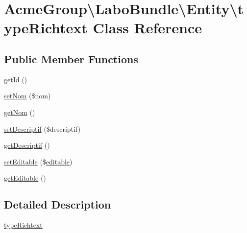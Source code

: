 \hypertarget{class_acme_group_1_1_labo_bundle_1_1_entity_1_1type_richtext}{\section{Acme\+Group\textbackslash{}Labo\+Bundle\textbackslash{}Entity\textbackslash{}type\+Richtext Class Reference}
\label{class_acme_group_1_1_labo_bundle_1_1_entity_1_1type_richtext}
}
\subsection*{Public Member Functions}
\begin{DoxyCompactItemize}
\item 
\hyperlink{class_acme_group_1_1_labo_bundle_1_1_entity_1_1type_richtext_a03d0d41d6a58f056e865620ce02cc9bb}{get\+Id} ()
\item 
\hyperlink{class_acme_group_1_1_labo_bundle_1_1_entity_1_1type_richtext_a00b84c73dab03128dfc6e6057087375d}{set\+Nom} (\$nom)
\item 
\hyperlink{class_acme_group_1_1_labo_bundle_1_1_entity_1_1type_richtext_ae39cd57718e5300ce84797504aae9196}{get\+Nom} ()
\item 
\hyperlink{class_acme_group_1_1_labo_bundle_1_1_entity_1_1type_richtext_a21c90a1eb85195fa7da2fdb3081ab25d}{set\+Descriptif} (\$descriptif)
\item 
\hyperlink{class_acme_group_1_1_labo_bundle_1_1_entity_1_1type_richtext_adc5c4ec2a7e9a3e0c45b9543e451dd99}{get\+Descriptif} ()
\item 
\hyperlink{class_acme_group_1_1_labo_bundle_1_1_entity_1_1type_richtext_ad6e5002b53e7ad13840c47368dbdccad}{set\+Editable} (\$\hyperlink{jquery_8jeditable_8js_a855cab08850661d0cbdf684f654b50f2}{editable})
\item 
\hyperlink{class_acme_group_1_1_labo_bundle_1_1_entity_1_1type_richtext_a158161fd8a5e3cb3310964d8593a41a0}{get\+Editable} ()
\end{DoxyCompactItemize}


\subsection{Detailed Description}
\hyperlink{class_acme_group_1_1_labo_bundle_1_1_entity_1_1type_richtext}{type\+Richtext}

